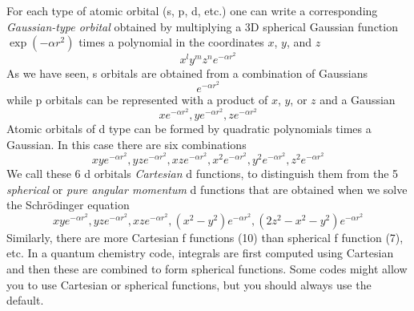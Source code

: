 \documentclass[../Main/chem371-notes.tex]{subfiles}
\begin{document}
For each type of atomic orbital (s, p, d, etc.) one can write a corresponding \emph{Gaussian-type orbital} obtained by multiplying a 3D spherical Gaussian function $\exp(-\alpha r^2)$ times a polynomial in the coordinates $x$, $y$, and $z$
\begin{equation}
\label{eq:primitive}
x^l y^m z^n e^{-\alpha r^2}
\end{equation}
As we have seen, s orbitals are obtained from a combination of Gaussians
\begin{equation}
e^{-\alpha r^2}
\end{equation}
while p orbitals can be represented with a product of $x$, $y$, or $z$ and a Gaussian
\begin{equation}
x e^{-\alpha r^2}, y e^{-\alpha r^2}, z e^{-\alpha r^2}
\end{equation}
Atomic orbitals of d type can be formed by quadratic polynomials times a Gaussian.
In this case there are six combinations
\begin{equation}
xy e^{-\alpha r^2}, yz e^{-\alpha r^2}, xz e^{-\alpha r^2},
x^2 e^{-\alpha r^2}, y^2 e^{-\alpha r^2}, z^2 e^{-\alpha r^2}
\end{equation}
We call these 6 d orbitals \emph{Cartesian} d functions, to distinguish them from the 5 \emph{spherical} or \emph{pure angular momentum} d functions that are obtained when we solve the Schr\"{o}dinger equation
\begin{equation}
xy e^{-\alpha r^2}, yz e^{-\alpha r^2}, xz e^{-\alpha r^2},
(x^2 - y^2) e^{-\alpha r^2},  (2 z^2 - x^2 - y^2)e^{-\alpha r^2}
\end{equation}
Similarly, there are more Cartesian f functions (10) than spherical f function (7), etc.
In a quantum chemistry code, integrals are first computed using Cartesian and then these are combined to form spherical functions.
Some codes might allow you to use Cartesian or spherical functions, but you should always use the default.

\end{document}

